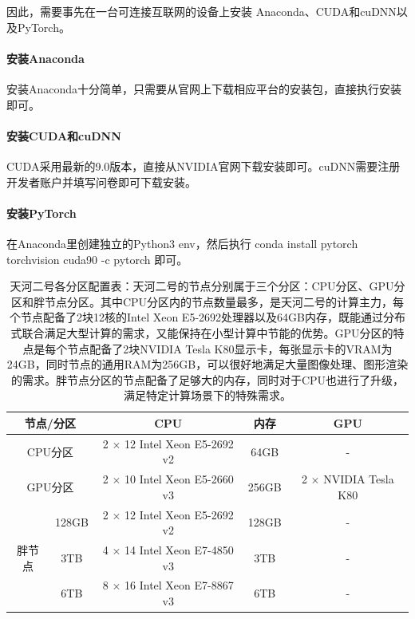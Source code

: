 因此，需要事先在一台可连接互联网的设备上安装 Anaconda、CUDA和cuDNN以及PyTorch。

\paragraph{安装Anaconda}

安装Anaconda十分简单，只需要从官网上下载相应平台的安装包，直接执行安装即可。

\paragraph{安装CUDA和cuDNN}

CUDA采用最新的9.0版本，直接从NVIDIA官网下载安装即可。cuDNN需要注册开发者账户并填写问卷即可下载安装。

\paragraph{安装PyTorch}

在Anaconda里创建独立的Python3 env，然后执行 conda install pytorch torchvision cuda90 -c pytorch 即可。

\begin{table}[]
\centering
\caption{天河二号各分区配置表：天河二号的节点分别属于三个分区：CPU分区、GPU分区和胖节点分区。其中CPU分区内的节点数量最多，是天河二号的计算主力，每个节点配备了2块12核的Intel Xeon E5-2692处理器以及64GB内存，既能通过分布式联合满足大型计算的需求，又能保持在小型计算中节能的优势。GPU分区的特点是每个节点配备了2块NVIDIA Tesla K80显示卡，每张显示卡的VRAM为24GB，同时节点的通用RAM为256GB，可以很好地满足大量图像处理、图形渲染的需求。胖节点分区的节点配备了足够大的内存，同时对于CPU也进行了升级，满足特定计算场景下的特殊需求。}

\label{tab:tianheconfig}
\begin{tabular}{|c|c|c|c|c|}
\hline
\multicolumn{2}{|c|}{节点/分区}  & CPU                          & 内存    & GPU                  \\ \hline
\multicolumn{2}{|c|}{CPU分区}  & 2 $\times$ 12 Intel Xeon E5-2692 v2 & 64GB  & -                    \\ \hline
\multicolumn{2}{|c|}{GPU分区}  & 2 $\times$ 10 Intel Xeon E5-2660 v3 & 256GB & 2 $\times$ NVIDIA Tesla K80 \\ \hline
\multirow{3}{*}{胖节点} & 128GB & 2 $\times$ 12 Intel Xeon E5-2692 v2 & 128GB & -                    \\ \cline{2-5}
                     & 3TB   & 4 $\times$ 14 Intel Xeon E7-4850 v3 & 3TB   & -                    \\ \cline{2-5}
                     & 6TB   & 8 $\times$ 16 Intel Xeon E7-8867 v3 & 6TB   & -                    \\ \hline
\end{tabular}
\end{table}

